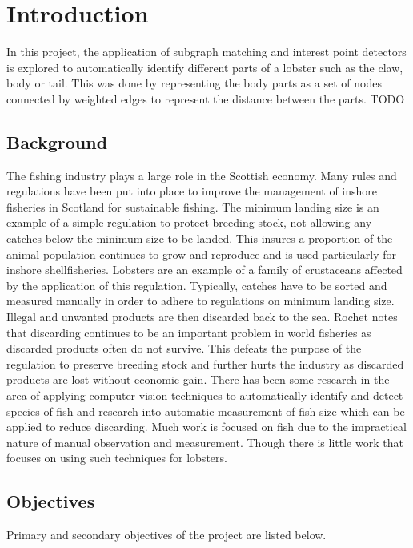 
\section{Introduction}
In this project, the application of subgraph matching and interest point detectors is explored to automatically identify different parts of a lobster such as the claw, body or tail. This was done by representing the body parts as a set of nodes connected by weighted edges to represent the distance between the parts. 
\n
TODO


\subsection{Background}
The fishing industry plays a large role in the Scottish economy. Many rules and regulations have been put into place to improve the management of inshore fisheries in Scotland for sustainable fishing. The minimum landing size is an example of a simple regulation to protect breeding stock, not allowing any catches below the minimum size to be landed. This insures a proportion of the animal population continues to grow and reproduce \cite{masts-report} and is used particularly for inshore shellfisheries. Lobsters are an example of a family of crustaceans affected by the application of this regulation. 
\n
Typically, catches have to be sorted and measured manually in order to adhere to regulations on minimum landing size. Illegal and unwanted products are then discarded back to the sea. Rochet \cite{discard} notes that discarding continues to be an important problem in world fisheries as discarded products often do not survive. This defeats the purpose of the regulation to preserve breeding stock and further hurts the industry as discarded products are lost without economic gain. 
\n
There has been some research in the area of applying computer vision techniques to automatically identify and detect species of fish \cite{iobserver, fish-detection, fish-classification} and research into automatic measurement of fish size \cite{fish-size, fish-size2} which can be applied to reduce discarding. Much work is focused on fish due to the impractical nature of manual observation and measurement. Though there is little work that focuses on using such techniques for lobsters.

\subsection{Objectives}
Primary and secondary objectives of the project are listed below.
